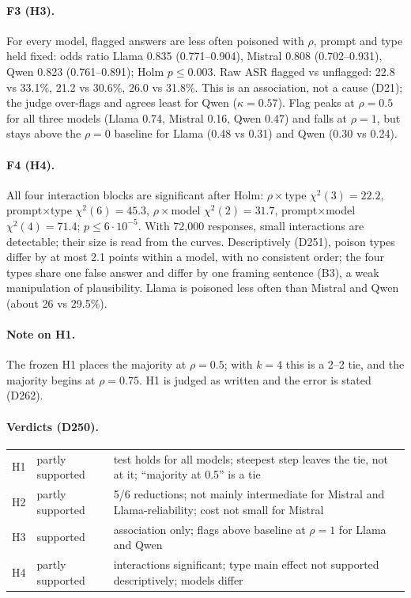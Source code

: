 \documentclass[11pt,a4paper]{report}
\begin{document}
\paragraph{F3 (H3).} For every model, flagged answers are less often poisoned with $\rho$, prompt and type
held fixed: odds ratio Llama 0.835 (0.771--0.904), Mistral 0.808 (0.702--0.931), Qwen 0.823 (0.761--0.891);
Holm $p\le0.003$. Raw ASR flagged vs unflagged: 22.8 vs 33.1\%, 21.2 vs 30.6\%, 26.0 vs 31.8\%. This is an
association, not a cause (D21); the judge over-flags and agrees least for Qwen ($\kappa=0.57$). Flag peaks
at $\rho=0.5$ for all three models (Llama 0.74, Mistral 0.16, Qwen 0.47) and falls at $\rho=1$, but stays above
the $\rho=0$ baseline for Llama (0.48 vs 0.31) and Qwen (0.30 vs 0.24).

\paragraph{F4 (H4).} All four interaction blocks are significant after Holm: $\rho\times$type
$\chi^2(3)=22.2$, prompt$\times$type $\chi^2(6)=45.3$, $\rho\times$model $\chi^2(2)=31.7$, prompt$\times$model
$\chi^2(4)=71.4$; $p\le6\cdot10^{-5}$. With 72{,}000 responses, small interactions are detectable; their size
is read from the curves. Descriptively (D251), poison types differ by at most 2.1 points within a model, with
no consistent order; the four types share one false answer and differ by one framing sentence (B3), a weak
manipulation of plausibility. Llama is poisoned less often than Mistral and Qwen (about 26 vs 29.5\%).

\paragraph{Note on H1.} The frozen H1 places the majority at $\rho=0.5$; with $k=4$ this is a 2--2 tie, and
the majority begins at $\rho=0.75$. H1 is judged as written and the error is stated (D262).

\paragraph{Verdicts (D250).}
\begin{tabular}{lll}
H1 & partly supported & test holds for all models; steepest step leaves the tie, not at it; ``majority at 0.5'' is a tie \\
H2 & partly supported & 5/6 reductions; not mainly intermediate for Mistral and Llama-reliability; cost not small for Mistral \\
H3 & supported & association only; flags above baseline at $\rho=1$ for Llama and Qwen \\
H4 & partly supported & interactions significant; type main effect not supported descriptively; models differ \\
\end{tabular}
\end{document}
